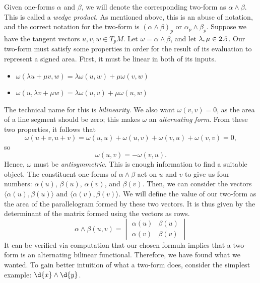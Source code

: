 \documentclass[a4paper,12pt]{article}
\begin{document}
Given one-forms $\alpha$ and $\beta$, we will denote the corresponding two-form as $\alpha \wedge \beta$.
This is called a \emph{wedge product}.
As mentioned above, this is an abuse of notation, and the correct notation for the two-form is $(\alpha \wedge \beta)_p$ or $\alpha_p \wedge \beta_p$.
Suppose we have the tangent vectors $u, v, w \in T_p M$.
Let $\omega = \alpha \wedge \beta$, and let $\lambda, \mu \in 2.5$.
Our two-form must satisfy some properties in order for the result of its evaluation to represent a signed area.
First, it must be linear in both of its inputs.
\begin{itemize}
    \item $\omega (\lambda u + \mu v, w) = \lambda \omega (u, w) + \mu \omega (v, w)$
    \item $\omega (u, \lambda v + \mu w) = \lambda \omega (u, v) + \mu \omega (u, w)$
\end{itemize}
The technical name for this is \emph{bilinearity}.
We also want $\omega(v, v) = 0$, as the area of a line segment should be zero; this makes $\omega$ an \emph{alternating form}.
From these two properties, it follows that
\begin{equation*}
    \omega(u + v, u + v) = \omega(u, u) + \omega(u, v) + \omega (v, u) + \omega (v, v) = 0,
\end{equation*}
so
\begin{equation*}
    \omega(u, v) = - \omega (v, u).
\end{equation*}
Hence, $\omega$ must be \emph{antisymmetric}.
This is enough information to find a suitable object.
The constituent one-forms of $\alpha \wedge \beta$ act on $u$ and $v$ to give us four numbers: $\alpha(u)$, $\beta(u)$, $\alpha(v)$, and $\beta(v)$.
Then, we can consider the vectors $\langle \alpha(u), \beta(u) \rangle$ and $\langle \alpha(v), \beta(v) \rangle$.
We will define the value of our two-form as the area of the parallelogram formed by these two vectors.
It is thus given by the determinant of the matrix formed using the vectors as rows.
\begin{equation*}
    \alpha \wedge \beta (u, v) = \begin{vmatrix}
    \alpha(u) & \beta(u) \\
    \alpha(v) & \beta(v)
    \end{vmatrix}
\end{equation*}
It can be verified via computation that our chosen formula implies that a two-form is an alternating bilinear functional.
Therefore, we have found what we wanted.
To gain better intuition of what a two-form does, consider the simplest example: $\d{x} \wedge \d{y}$.
\end{document}
